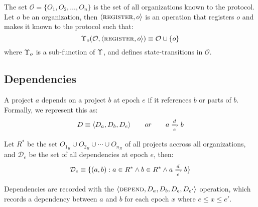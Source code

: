 The set $\mathcal{O} = \{O_1, O_2, \dotsc, O_n\}$ is the set of all organizations
known to the protocol.  Let $o$ be an organization, then $\langle \text{\normalfont\scshape register}, o \rangle$ is
an operation that registers $o$ and makes it known to the protocol such that:
\[
    \Upsilon_o(\mathcal{O}, \langle \text{\normalfont\scshape register}, o \rangle)
    \equiv \mathcal{O} \cup \{o\}
\]
where $\Upsilon_o$ is a sub-function of $\Upsilon$, and defines
state-transitions in $\mathcal{O}$.

\subsection{Dependencies}
\label{dependencies}

A project $a$ depends on a project $b$ at epoch $e$ if it references $b$
or parts of $b$. Formally, we represent this as:
\[
    D \equiv \tuple{D_a, D_b, D_e} \qquad or \qquad a \dep b
\]


Let $R^*$ be the set $O_{1_R} \cup O_{2_R} \cup \cdots \cup
O_{n_R}$ of all projects accross all organizations, and $\mathcal{D}_e$ be the
set of all dependencies at epoch $e$, then:
\[
    \mathcal{D}_e \equiv \{(a, b) : a \in R^*
    \land b \in R^*
    \land a \dep b \}
\]

Dependencies are recorded with the $\langle \text{\normalfont\scshape depend}, D_a, D_b, D_e, D_{e'} \rangle$
operation, which records a dependency between $a$ and $b$ for each epoch $x$
where $e \leqslant x \leqslant e'$.
